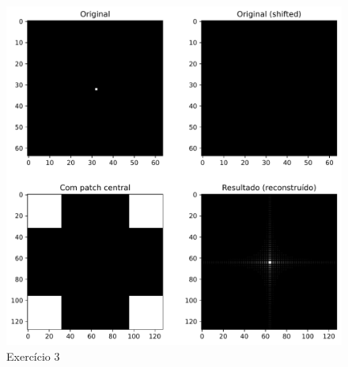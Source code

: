 \documentclass[english]{sbrt}
\begin{document}
\begin{figure}[htb]
    \centering
    \includegraphics[width=0.95\linewidth]{point_target.pdf}
    \caption{Exercício 3}
    \label{fig:Exercício 3}
\end{figure}
\end{document}

